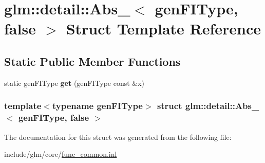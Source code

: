 \hypertarget{structglm_1_1detail_1_1Abs___3_01genFIType_00_01false_01_4}{\section{glm\-:\-:detail\-:\-:\-Abs\-\_\-$<$ gen\-F\-I\-Type, false $>$ \-Struct \-Template \-Reference}
\label{structglm_1_1detail_1_1Abs___3_01genFIType_00_01false_01_4}
}
\subsection*{\-Static \-Public \-Member \-Functions}
\begin{DoxyCompactItemize}
\item 
\hypertarget{structglm_1_1detail_1_1Abs___3_01genFIType_00_01false_01_4_a14974cbcc524a914d5a4d5a7cdd4557b}{static gen\-F\-I\-Type {\bfseries get} (gen\-F\-I\-Type const \&x)}\label{structglm_1_1detail_1_1Abs___3_01genFIType_00_01false_01_4_a14974cbcc524a914d5a4d5a7cdd4557b}

\end{DoxyCompactItemize}
\subsubsection*{template$<$typename gen\-F\-I\-Type$>$ struct glm\-::detail\-::\-Abs\-\_\-$<$ gen\-F\-I\-Type, false $>$}



\-The documentation for this struct was generated from the following file\-:\begin{DoxyCompactItemize}
\item 
include/glm/core/\hyperlink{func__common_8inl}{func\-\_\-common.\-inl}\end{DoxyCompactItemize}
